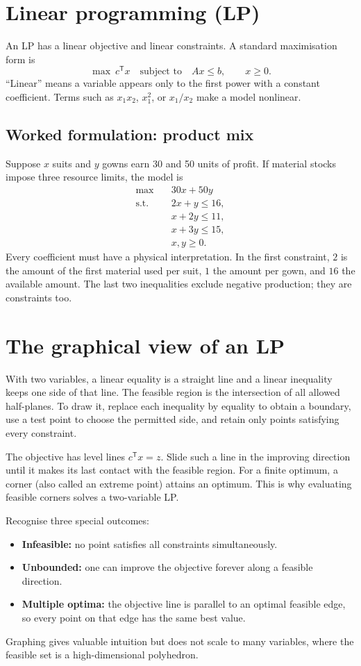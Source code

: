 \documentclass[11pt,a4paper]{article}
\newcommand{\T}{\mathsf{T}}
\begin{document}
\section{Linear programming (LP)}
An LP has a linear objective and linear constraints. A standard maximisation form is
\[
 \max\ c^\T x\quad\text{subject to}\quad Ax\leq b,\qquad x\geq0.
\]
``Linear'' means a variable appears only to the first power with a constant coefficient. Terms such as $x_1x_2$, $x_1^2$, or $x_1/x_2$ make a model nonlinear.

\subsection{Worked formulation: product mix}
Suppose $x$ suits and $y$ gowns earn 30 and 50 units of profit. If material stocks impose three resource limits, the model is
\[
\begin{aligned}
 \max\quad&30x+50y\\
 \text{s.t.}\quad&2x+y\leq16,\\
 &x+2y\leq11,\\
 &x+3y\leq15,\\
 &x,y\geq0.
\end{aligned}
\]
Every coefficient must have a physical interpretation. In the first constraint, $2$ is the amount of the first material used per suit, $1$ the amount per gown, and $16$ the available amount. The last two inequalities exclude negative production; they are constraints too.

\section{The graphical view of an LP}
With two variables, a linear equality is a straight line and a linear inequality keeps one side of that line. The feasible region is the intersection of all allowed half-planes. To draw it, replace each inequality by equality to obtain a boundary, use a test point to choose the permitted side, and retain only points satisfying every constraint.

The objective has level lines $c^\T x=z$. Slide such a line in the improving direction until it makes its last contact with the feasible region. For a finite optimum, a corner (also called an extreme point) attains an optimum. This is why evaluating feasible corners solves a two-variable LP.

Recognise three special outcomes:
\begin{itemize}
\item \textbf{Infeasible:} no point satisfies all constraints simultaneously.
\item \textbf{Unbounded:} one can improve the objective forever along a feasible direction.
\item \textbf{Multiple optima:} the objective line is parallel to an optimal feasible edge, so every point on that edge has the same best value.
\end{itemize}
Graphing gives valuable intuition but does not scale to many variables, where the feasible set is a high-dimensional polyhedron.
\end{document}
